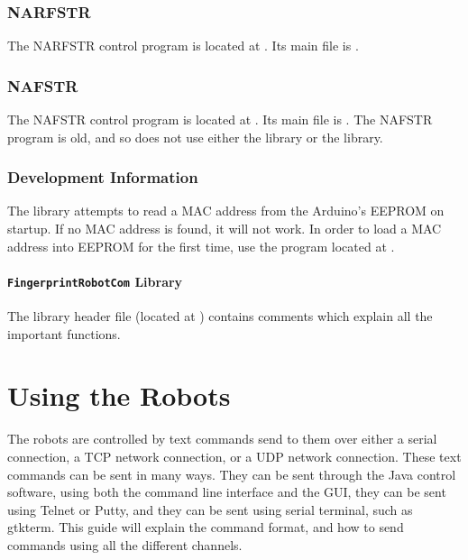 \documentclass[letterpaper,10pt,english]{sphinxmanual}
\begin{document}
\subsection{NARFSTR}
\label{ProgramDevelopment:narfstr}
The NARFSTR control program is located at . Its main file is .


\subsection{NAFSTR}
\label{ProgramDevelopment:nafstr}
The NAFSTR control program is located at . Its main file is . The NAFSTR program is old, and so does not use either the  library or the  library.


\subsection{Development Information}
\label{ProgramDevelopment:development-information}
The  library attempts to read a MAC address from the Arduino's EEPROM on startup. If no MAC address is found, it will not work. In order to load a MAC address into EEPROM for the first time, use the  program located at .


\subsubsection{\texttt{FingerprintRobotCom} Library}
\label{ProgramDevelopment:fingerprintrobotcom-library}
The  library header file (located at ) contains comments which explain all the important functions.


\chapter{Using the Robots}
\label{Use:using-the-robots}\label{Use::doc}
The robots are controlled by text commands send to them over either a serial connection, a TCP network connection, or a UDP network connection. These text commands can be sent in many ways. They can be sent through the Java control software, using both the command line interface and the GUI, they can be sent using Telnet or Putty, and they can be sent using serial terminal, such as gtkterm. This guide will explain the command format, and how to send commands using all the different channels.
\end{document}
